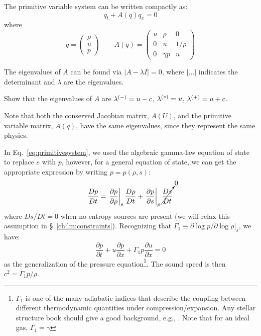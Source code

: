 %
The primitive variable system can be written compactly as:
\begin{equation}
q_t + A(q) q_x = 0
\end{equation}
where
\begin{equation}
q = \left ( \begin{array}{c} \rho \\ u \\ p \end{array} \right )
%
\qquad
A(q) = \left ( \begin{array}{ccc} u  & \rho     & 0 \\
                                  0  &  u       & 1/\rho \\
                                  0  & \gamma p & u \end{array} \right )
\label{eq:primitivesystem}
\end{equation}



The eigenvalues of $A$ can be found via $| A - \lambda I | = 0$,
where $|\ldots|$ indicates the determinant and $\lambda$ are the eigenvalues.
\begin{exercise}
{
Show that the eigenvalues of $A$ are $\lambda^{(-)} = u -c$, $\lambda^{(\circ)} = u$, $\lambda^{(+)} = u+c$.
}
\end{exercise}
Note that both the conserved Jacobian matrix, $A(U)$, and the
primitive variable matrix, $A(q)$, have the same eigenvalues,
 since they represent the same physics.

In Eq.~\ref{eq:primitivesystem}, we used the algebraic gamma-law
equation of state to replace $e$ with $p$, however, for a general
equation of state, we can get the appropriate expression by writing $p
= p(\rho, s)$:
\begin{equation}
\frac{Dp}{Dt} = \left . \frac{\partial p}{\partial \rho} \right |_s
     \frac{D\rho}{Dt} +
     \left . \frac{\partial p}{\partial s} \right |_\rho
     \cancelto{0}{\frac{Ds}{Dt}}
\end{equation}
where $Ds/Dt = 0$ when no entropy sources are present (we will relax this
assumption in \S~\ref{ch:lm:constraints}).  Recognizing
that $\Gamma_1 \equiv \partial \log p/\partial \log \rho |_s$, we have:
\begin{equation}
\frac{\partial p}{\partial t} + u \frac{\partial p}{\partial x}
  + \Gamma_1 p \frac{\partial u}{\partial x} = 0  \label{eq:euler:pgeneral}
\end{equation}
as the generalization of the pressure equation\footnote{$\Gamma_1$ is one of the
many adiabatic indices that describe the coupling between different
thermodynamic quantities under compression/expansion.  Any stellar structure
book should give a good background, e.g., \cite{HKT}.  Note that for an ideal gas, $\Gamma_1 = \gamma$}.
The sound speed is then $c^2 = \Gamma_1 p /\rho$.

